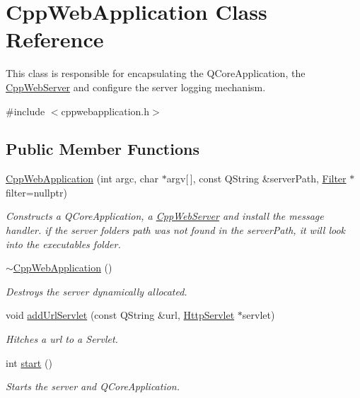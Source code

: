 \hypertarget{class_cpp_web_application}{}\section{Cpp\+Web\+Application Class Reference}
\label{class_cpp_web_application}


This class is responsible for encapsulating the Q\+Core\+Application, the \hyperlink{class_cpp_web_server}{Cpp\+Web\+Server} and configure the server logging mechanism.  




{\ttfamily \#include $<$cppwebapplication.\+h$>$}

\subsection*{Public Member Functions}
\begin{DoxyCompactItemize}
\item 
\hyperlink{class_cpp_web_application_a76766ee1be8080db9db6df98e1b9e907}{Cpp\+Web\+Application} (int argc, char $\ast$argv\mbox{[}$\,$\mbox{]}, const Q\+String \&server\+Path, \hyperlink{class_filter}{Filter} $\ast$filter=nullptr)
\begin{DoxyCompactList}\small\item\em Constructs a Q\+Core\+Application, a \hyperlink{class_cpp_web_server}{Cpp\+Web\+Server} and install the message handler. if the server folder\textquotesingle{}s path was not found in the server\+Path, it will look into the executable\textquotesingle{}s folder. \end{DoxyCompactList}\item 
\mbox{\label{class_cpp_web_application_a96a7655a25d2e35ed545cdb7b8d81cc5}} 
\hyperlink{class_cpp_web_application_a96a7655a25d2e35ed545cdb7b8d81cc5}{$\sim$\+Cpp\+Web\+Application} ()
\begin{DoxyCompactList}\small\item\em Destroys the server dynamically allocated. \end{DoxyCompactList}\item 
void \hyperlink{class_cpp_web_application_aa8c0b5330f0133fc478b921f2a05dcec}{add\+Url\+Servlet} (const Q\+String \&url, \hyperlink{class_http_servlet}{Http\+Servlet} $\ast$servlet)
\begin{DoxyCompactList}\small\item\em Hitches a url to a Servlet. \end{DoxyCompactList}\item 
int \hyperlink{class_cpp_web_application_a1e9f2c789934748d6b7c29ad33e9d7c9}{start} ()
\begin{DoxyCompactList}\small\item\em Starts the server and Q\+Core\+Application. \end{DoxyCompactList}\end{DoxyCompactItemize}


